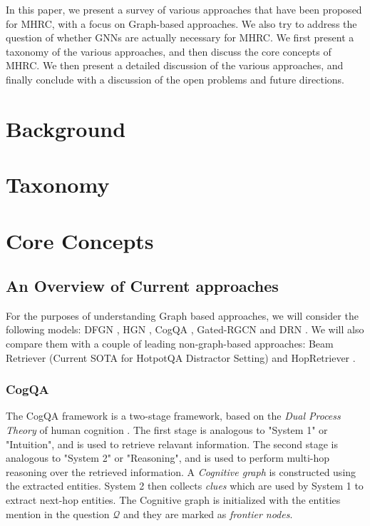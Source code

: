 \documentclass[sigplan,screen]{acmart}
\begin{document}
In this paper, we present a survey of various approaches that have been proposed for MHRC, with a focus on Graph-based approaches. We also try to
address the question of whether GNNs are actually necessary for MHRC. We first present a taxonomy of the various approaches, and then discuss the
core concepts of MHRC. We then present a detailed discussion of the various approaches, and finally conclude with a discussion of the open problems 
and future directions.

\section{Background}

\section{Taxonomy}

\section{Core Concepts}
\subsection{An Overview of Current approaches}
For the purposes of understanding Graph based approaches, we will consider the following models:
DFGN \cite{RN122}, HGN \cite{RN119}, CogQA \cite{RN118}, Gated-RGCN \cite{RN91} and DRN \cite{RN142}. We will also compare them with 
a couple of leading non-graph-based approaches: Beam Retriever \cite{RN105} (Current SOTA for HotpotQA Distractor Setting) and
HopRetriever \cite{RN149}.

\subsubsection{CogQA}
The CogQA framework \cite{RN118} is a two-stage framework, based on the \emph{Dual Process Theory} of human cognition \cite{RN137}.
The first stage is analogous to "System 1" or "Intuition", and is used to retrieve relavant information. The second stage is analogous to
"System 2" or "Reasoning", and is used to perform multi-hop reasoning over the retrieved information. A \emph{Cognitive graph} is constructed
using the extracted entities. System 2 then collects \emph{clues} which are used by System 1 to extract next-hop entities.
The Cognitive graph is initialized with the entities mention in the question $\mathcal{Q}$ and they are marked as \emph{frontier nodes}.
\end{document}
